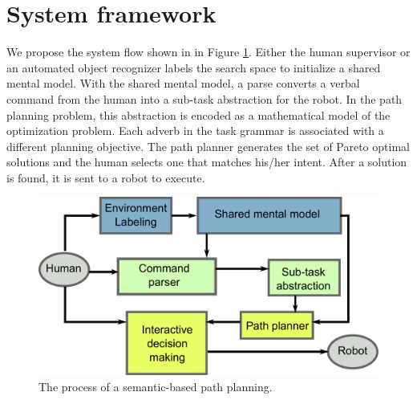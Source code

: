 \section{System framework}
\label{sec:system}

We propose the system flow shown in in Figure \ref{fig:sys_flow}.
Either the human supervisor or an automated object recognizer labels the search space to initialize a shared mental model.
With the shared mental model, a parse converts a verbal command from the human into a sub-task abstraction for the robot.
In the path planning problem, this abstraction is encoded as a mathematical model of the optimization problem.
Each adverb in the task grammar is associated with a different planning objective.
The path planner generates the set of Pareto optimal solutions and the human selects one that matches his/her intent. 
After a solution is found, it is sent to a robot to execute.

\begin{figure}[tbph]
\centering
\includegraphics[width=0.5\linewidth]{./images/sys_flow}
\caption{The process of a semantic-based path planning.}
\label{fig:sys_flow}
\end{figure}

